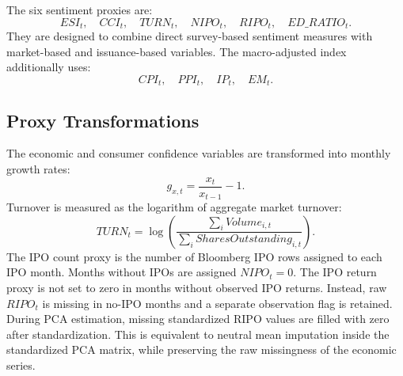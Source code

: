 \documentclass[12pt]{article}
\begin{document}
The six sentiment proxies are:
\[
ESI_t,\quad CCI_t,\quad TURN_t,\quad NIPO_t,\quad RIPO_t,\quad ED\_RATIO_t.
\]
They are designed to combine direct survey-based sentiment measures with market-based and issuance-based variables. The macro-adjusted index additionally uses:
\[
CPI_t,\quad PPI_t,\quad IP_t,\quad EM_t.
\]

\begin{table}[htbp]
\centering
\caption{Sentiment Proxies and Implemented Transformations}
\label{tab:sentiment_proxy_definitions}
\end{table}

\subsection{Proxy Transformations}

The economic and consumer confidence variables are transformed into monthly growth rates:
\[
g_{x,t} = \frac{x_t}{x_{t-1}} - 1.
\]
Turnover is measured as the logarithm of aggregate market turnover:
\[
TURN_t = \log\left(\frac{\sum_i Volume_{i,t}}{\sum_i SharesOutstanding_{i,t}}\right).
\]
The IPO count proxy is the number of Bloomberg IPO rows assigned to each IPO month. Months without IPOs are assigned \(NIPO_t=0\). The IPO return proxy is not set to zero in months without observed IPO returns. Instead, raw \(RIPO_t\) is missing in no-IPO months and a separate observation flag is retained. During PCA estimation, missing standardized RIPO values are filled with zero after standardization. This is equivalent to neutral mean imputation inside the standardized PCA matrix, while preserving the raw missingness of the economic series.
\end{document}
